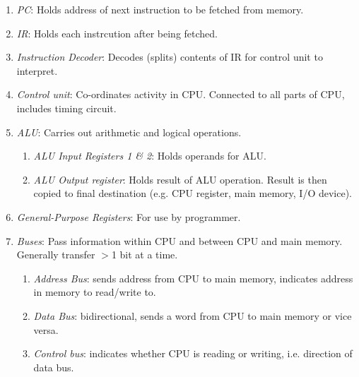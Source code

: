 \documentclass[twocolumn,english]{article}
\begin{document}
\begin{enumerate}
\item \emph{PC}: Holds address of next instruction to be fetched from memory.
\item \emph{IR}: Holds each instrcution after being fetched.
\item \emph{Instruction Decoder}: Decodes (splits) contents of IR for control
unit to interpret.
\item \emph{Control unit}: Co-ordinates activity in CPU. Connected to all
parts of CPU, includes timing circuit.
\item \emph{ALU}: Carries out arithmetic and logical operations.

\begin{enumerate}
\item \emph{ALU Input Registers 1 \& 2}: Holds operands for ALU.
\item \emph{ALU Output register}: Holds result of ALU operation. Result
is then copied to final destination (e.g. CPU register, main memory,
I/O device).
\end{enumerate}
\item \emph{General-Purpose Registers}: For use by programmer.
\item \emph{Buses}: Pass information within CPU and between CPU and main
memory. Generally transfer $>$1 bit at a time.

\begin{enumerate}
\item \emph{Address Bus}: sends address from CPU to main memory, indicates
address in memory to read/write to.
\item \emph{Data Bus}: bidirectional, sends a word from CPU to main memory
or vice versa.
\item \emph{Control bus}: indicates whether CPU is reading or writing, i.e.
direction of data bus.
\end{enumerate}
\end{enumerate}
\end{document}
